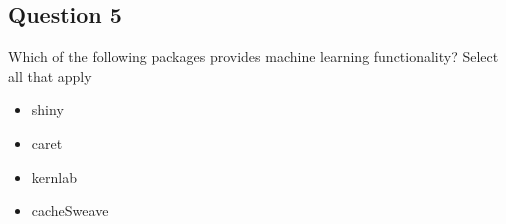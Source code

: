 \subsection*{Question 5}
Which of the following packages provides machine learning functionality? Select all that apply
\begin{itemize}
\item shiny
\item caret
\item kernlab
\item cacheSweave
\end{itemize}

